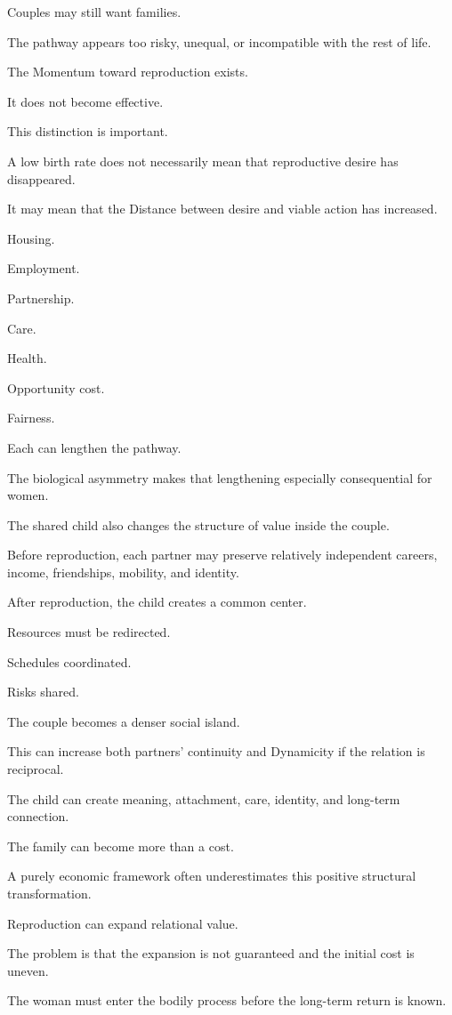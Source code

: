 Couples may still want families.

The pathway appears too risky, unequal, or incompatible with the rest of life.

The Momentum toward reproduction exists.

It does not become effective.

This distinction is important.

A low birth rate does not necessarily mean that reproductive desire has disappeared.

It may mean that the Distance between desire and viable action has increased.

Housing.

Employment.

Partnership.

Care.

Health.

Opportunity cost.

Fairness.

Each can lengthen the pathway.

The biological asymmetry makes that lengthening especially consequential for women.

The shared child also changes the structure of value inside the couple.

Before reproduction, each partner may preserve relatively independent careers, income, friendships, mobility, and identity.

After reproduction, the child creates a common center.

Resources must be redirected.

Schedules coordinated.

Risks shared.

The couple becomes a denser social island.

This can increase both partners’ continuity and Dynamicity if the relation is reciprocal.

The child can create meaning, attachment, care, identity, and long-term connection.

The family can become more than a cost.

A purely economic framework often underestimates this positive structural transformation.

Reproduction can expand relational value.

The problem is that the expansion is not guaranteed and the initial cost is uneven.

The woman must enter the bodily process before the long-term return is known.

